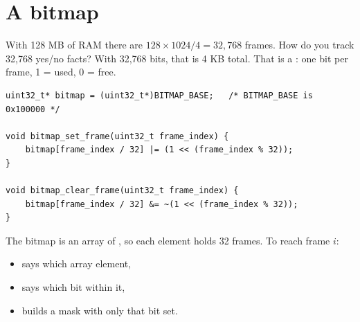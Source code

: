 \section{A bitmap}

With 128 MB of RAM there are $128 \times 1024 / 4 = 32{,}768$ frames. How do you track 32,768
yes/no facts? With 32,768 bits, that is 4 KB total. That is a : one bit per frame, 1 =
used, 0 = free.

\begin{lstlisting}[style=c]
uint32_t* bitmap = (uint32_t*)BITMAP_BASE;   /* BITMAP_BASE is 0x100000 */

void bitmap_set_frame(uint32_t frame_index) {
    bitmap[frame_index / 32] |= (1 << (frame_index % 32));
}

void bitmap_clear_frame(uint32_t frame_index) {
    bitmap[frame_index / 32] &= ~(1 << (frame_index % 32));
}
\end{lstlisting}

The bitmap is an array of , so each element holds 32 frames. To reach frame $i$:

\begin{itemize}
  \item {} says which array element,
  \item {} says which bit within it,
  \item {} builds a mask with only that bit set.
\end{itemize}

\begin{center}
\end{center}

